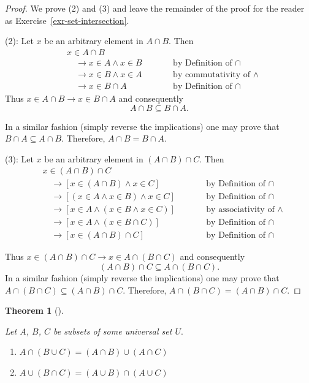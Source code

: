 \documentclass[
  letterpaper,
  10pt,
  reqno,
  twopage,
  openany]{book}
\providecommand{\tightlist}{%
  \setlength{\itemsep}{0pt}\setlength{\parskip}{0pt}}\usepackage{longtable,booktabs,array}
\theoremstyle{plain}
\theoremstyle{definition}
\theoremstyle{definition}
\theoremstyle{definition}
\theoremstyle{plain}
\theoremstyle{plain}
\newtheorem{theorem}{Theorem}[chapter]
\theoremstyle{remark}
\begin{document}
\begin{proof}

We prove (2) and (3) and leave the remainder of the proof for the reader
as Exercise~\ref{exr-set-intersection}.

(2): Let \(x\) be an arbitrary element in \(A\cap B.\) Then
\begin{align*}
& x\in A \cap B & \qquad & \\
& \quad \rightarrow  x\in A\land x\in B & &  \text{by Definition of $\cap$} \\
& \quad \rightarrow x\in B\land x\in A & &  \text{by commutativity of $\land$} \\
& \quad \rightarrow x\in B \cap A  & &  \text{by Definition of $\cap$}
\end{align*} Thus \(x\in A\cap B\rightarrow x\in B\cap A\) and
consequently \[
A\cap B\subseteq B\cap A.
\]

In a similar fashion (simply reverse the implications) one may prove
that \(B\cap A\subseteq A\cap B.\) Therefore, \(A\cap B=B\cap A\).

(3): Let \(x\) be an arbitrary element in \((A \cap B)\cap C.\) Then
\begin{align*}
& x\in (A \cap B)\cap C & \qquad & \\
& \quad \rightarrow [ x\in (A \cap B) \land x\in C ] & & \text{by Definition of $\cap$} \\
& \quad \rightarrow [ (x\in A \land x\in B)\land x\in C ]& & \text{by Definition of $\cap$} \\
& \quad \rightarrow [ x\in A \land ( x\in B \land x\in C) ] & & 
\text{by associativity of $\land$} \\
& \quad \rightarrow [ x\in A \land ( x\in B \cap C) ]& & 
\text{by Definition of $\cap$} \\
& \quad \rightarrow [ x\in (A \cap B) \cap C ] & & 
\text{by Definition of $\cap$}
\end{align*}

Thus \(x\in (A\cap B)\cap C \rightarrow x\in A\cap (B\cap C)\) and
consequently \[
(A\cap B)\cap C\subseteq A\cap (B\cap C).
\] In a similar fashion (simply reverse the implications) one may prove
that \(A\cap (B\cap C)\subseteq (A\cap B)\cap C.\) Therefore,
\(A\cap (B\cap C)=(A\cap B)\cap C.\)

\end{proof}

\leavevmode{}%
\begin{theorem}[]\label{thm-cap-cup}

Let \(A\), \(B\), \(C\) be subsets of some universal set \(U.\)

\begin{enumerate}
\def\labelenumi{\arabic{enumi}.}
\tightlist
\item
  \(A\cap (B \cup C) = (A\cap B)\cup (A\cap C)\)
\item
  \(A\cup (B \cap C) = (A\cup B)\cap (A\cup C)\)
\end{enumerate}

\end{theorem}
\end{document}
